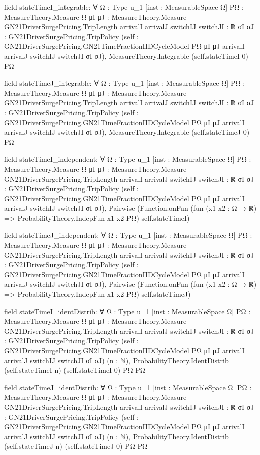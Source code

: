\documentclass[10pt]{article}
\begin{document}
\begin{ReviewVerbatim}
field stateTimeI_integrable:
∀ {Ω : Type u_1} [inst : MeasurableSpace Ω] {PΩ : MeasureTheory.Measure Ω}
  {μI μJ : MeasureTheory.Measure GN21DriverSurgePricing.TripLength} {arrivalI arrivalJ switchIJ switchJI : ℝ}
  {σI σJ : GN21DriverSurgePricing.TripPolicy}
  (self : GN21DriverSurgePricing.GN21TimeFractionIIDCycleModel PΩ μI μJ arrivalI arrivalJ switchIJ switchJI σI σJ),
  MeasureTheory.Integrable (self.stateTimeI 0) PΩ

field stateTimeJ_integrable:
∀ {Ω : Type u_1} [inst : MeasurableSpace Ω] {PΩ : MeasureTheory.Measure Ω}
  {μI μJ : MeasureTheory.Measure GN21DriverSurgePricing.TripLength} {arrivalI arrivalJ switchIJ switchJI : ℝ}
  {σI σJ : GN21DriverSurgePricing.TripPolicy}
  (self : GN21DriverSurgePricing.GN21TimeFractionIIDCycleModel PΩ μI μJ arrivalI arrivalJ switchIJ switchJI σI σJ),
  MeasureTheory.Integrable (self.stateTimeJ 0) PΩ

field stateTimeI_independent:
∀ {Ω : Type u_1} [inst : MeasurableSpace Ω] {PΩ : MeasureTheory.Measure Ω}
  {μI μJ : MeasureTheory.Measure GN21DriverSurgePricing.TripLength} {arrivalI arrivalJ switchIJ switchJI : ℝ}
  {σI σJ : GN21DriverSurgePricing.TripPolicy}
  (self : GN21DriverSurgePricing.GN21TimeFractionIIDCycleModel PΩ μI μJ arrivalI arrivalJ switchIJ switchJI σI σJ),
  Pairwise (Function.onFun (fun (x1 x2 : Ω → ℝ) => ProbabilityTheory.IndepFun x1 x2 PΩ) self.stateTimeI)

field stateTimeJ_independent:
∀ {Ω : Type u_1} [inst : MeasurableSpace Ω] {PΩ : MeasureTheory.Measure Ω}
  {μI μJ : MeasureTheory.Measure GN21DriverSurgePricing.TripLength} {arrivalI arrivalJ switchIJ switchJI : ℝ}
  {σI σJ : GN21DriverSurgePricing.TripPolicy}
  (self : GN21DriverSurgePricing.GN21TimeFractionIIDCycleModel PΩ μI μJ arrivalI arrivalJ switchIJ switchJI σI σJ),
  Pairwise (Function.onFun (fun (x1 x2 : Ω → ℝ) => ProbabilityTheory.IndepFun x1 x2 PΩ) self.stateTimeJ)

field stateTimeI_identDistrib:
∀ {Ω : Type u_1} [inst : MeasurableSpace Ω] {PΩ : MeasureTheory.Measure Ω}
  {μI μJ : MeasureTheory.Measure GN21DriverSurgePricing.TripLength} {arrivalI arrivalJ switchIJ switchJI : ℝ}
  {σI σJ : GN21DriverSurgePricing.TripPolicy}
  (self : GN21DriverSurgePricing.GN21TimeFractionIIDCycleModel PΩ μI μJ arrivalI arrivalJ switchIJ switchJI σI σJ)
  (n : ℕ), ProbabilityTheory.IdentDistrib (self.stateTimeI n) (self.stateTimeI 0) PΩ PΩ

field stateTimeJ_identDistrib:
∀ {Ω : Type u_1} [inst : MeasurableSpace Ω] {PΩ : MeasureTheory.Measure Ω}
  {μI μJ : MeasureTheory.Measure GN21DriverSurgePricing.TripLength} {arrivalI arrivalJ switchIJ switchJI : ℝ}
  {σI σJ : GN21DriverSurgePricing.TripPolicy}
  (self : GN21DriverSurgePricing.GN21TimeFractionIIDCycleModel PΩ μI μJ arrivalI arrivalJ switchIJ switchJI σI σJ)
  (n : ℕ), ProbabilityTheory.IdentDistrib (self.stateTimeJ n) (self.stateTimeJ 0) PΩ PΩ


\end{ReviewVerbatim}
\end{document}
